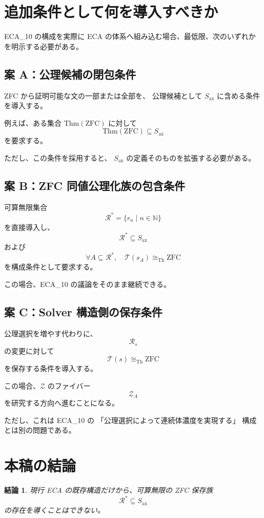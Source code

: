 \documentclass[a4paper,11pt]{jsarticle}
\newtheorem{conclusion}[definition]{結論}
\newcommand{\Ax}{S_{\mathrm{ax}}}
\begin{document}
\section{追加条件として何を導入すべきか}

ECA_10 の構成を実際に ECA の体系へ組み込む場合、最低限、次のいずれかを明示する必要がある。

\subsection{案 A：公理候補の閉包条件}

ZFC から証明可能な文の一部または全部を、
公理候補として $\Ax$ に含める条件を導入する。

例えば、ある集合 $\mathrm{Thm}(\mathrm{ZFC})$ に対して
\[
\mathrm{Thm}(\mathrm{ZFC})\subseteq\Ax
\]
を要求する。

ただし、この条件を採用すると、
$\Ax$ の定義そのものを拡張する必要がある。

\subsection{案 B：ZFC 同値公理化族の包含条件}

可算無限集合
\[
\mathcal{R}^{*}
=
\{r_n\mid n\in\mathbb{N}\}
\]
を直接導入し、
\[
\mathcal{R}^{*}\subseteq\Ax
\]
および
\[
\forall A\subseteq\mathcal{R}^{*},
\quad
\mathcal{T}(s_A)\cong_{\mathrm{Th}}\mathrm{ZFC}
\]
を構成条件として要求する。

この場合、ECA_10 の議論をそのまま継続できる。

\subsection{案 C：Solver 構造側の保存条件}

公理選択を増やす代わりに、
\[
\mathcal{R}_s
\]
の変更に対して
\[
\mathcal{T}(s)\cong_{\mathrm{Th}}\mathrm{ZFC}
\]
を保存する条件を導入する。

この場合、$\mathcal{Z}$ のファイバー
\[
\mathcal{Z}_A
\]
を研究する方向へ進むことになる。

ただし、これは ECA_10 の
「公理選択によって連続体濃度を実現する」
構成とは別の問題である。

\section{本稿の結論}

\begin{conclusion}
現行 ECA の既存構造だけから、可算無限の
ZFC 保存族
\[
\mathcal{R}^{*}\subseteq\Ax
\]
の存在を導くことはできない。
\end{conclusion}
\end{document}
